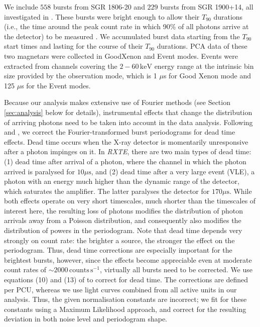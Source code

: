 \documentclass[numberedappendix]{emulateapj}
\newcommand{\project}[1]{\textsl{#1}}
\newcommand{\rxte}{\project{RXTE}}
\begin{document}
We include  $558$ bursts from SGR 1806-20 and $229$ bursts from SGR 1900+14, all investigated in \citet{gogus2001}. These bursts were bright enough to allow their $T_{90}$ durations (i.e., the time around the peak count rate in which 90\% of all photons arrive at the detector) to be measured \citep{gogus2001}. We accumulated burst data starting from the $T_{90}$ start times and lasting for the course of their $T_{90}$ durations. PCA data of these two magnetars were collected in GoodXenon and Event modes. Events were extracted from channels covering the $2-60\,\mathrm{keV}$ energy range at the intrinsic bin size provided by the observation mode, which is 1 $\mu$s for Good Xenon mode and 125 $\mu$s for the Event modes.  

Because our analysis makes extensive use of Fourier methods (see Section \ref{sec:analysis} below for details), instrumental effects that change the distribution of arriving photons need to be taken into account in the data analysis.
Following \citet{zhang1995} and \citet{jahoda2006}, we correct the Fourier-transformed burst periodograms for dead time effects. Dead time occurs when the X-ray detector is momentarily unresponsive after a photon impinges on it. In \rxte, there are two main types of dead time: (1) dead time after arrival of a photon, where the channel in which the photon arrived is paralysed for $10\mu\mathrm{s}$, and (2) dead time after a very large event (VLE), a photon with an energy much higher than the dynamic range of the detector, which saturates the amplifier. The latter paralyses the detector for $170\mu\mathrm{s}$. While both effects operate on very short timescales, much shorter than the timescales of interest here, the resulting loss of photons modifies the distribution of photon arrivals away from a Poisson distribution, and consequently also modifies the distribution of powers in the periodogram. Note that dead time depends very strongly on count rate: the brighter a source, the stronger the effect on the periodogram. Thus, dead time corrections are especially important for the brightest bursts, however, since the effects become appreciable even at moderate count rates of $\sim 2000 \,\mathrm{counts}\,\mathrm{s}^{-1}$, virtually all bursts need to be corrected. We use equations (10) and (13) of \citet{jahoda2006} to correct for dead time. The corrections are defined per PCU, whereas we use light curves combined from all active units in our analysis. Thus, the given normalisation constants are incorrect; we fit for these constants using a Maximum Likelihood approach, and correct for the resulting deviation in both noise level and periodogram shape. 
\end{document}
